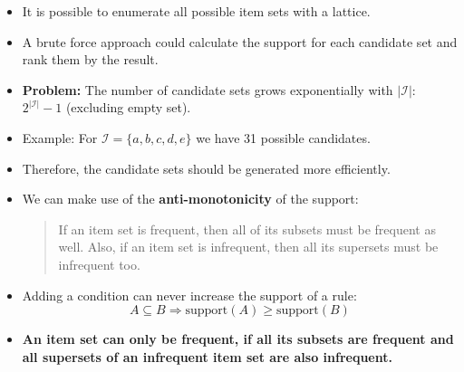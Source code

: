\begin{frame}
	\begin{itemize}
		\item It is possible to enumerate all possible item sets with a lattice.
		\item A brute force approach could calculate the support for each candidate set and rank them by the result.
		\item \textbf{Problem:} The number of candidate sets grows exponentially with $\vert \mathcal{I} \vert$: $2^{\vert \mathcal{I} \vert} - 1$ (excluding empty set).
		\item Example: For $\mathcal{I} = \{ a, b, c, d, e \}$ we have 31 possible candidates.
		\item Therefore, the candidate sets should be generated more efficiently.
		\item We can make use of the \textbf{anti-monotonicity} of the support:
		\begin{quote}
			If an item set is frequent, then all of its subsets must be frequent as well. Also, if an item set is infrequent, then all its supersets must be infrequent too.
		\end{quote}
		\item Adding a condition can never increase the support of a rule:
		\begin{equation}
			A \subseteq B \Longrightarrow \text{support}(A) \ge \text{support}(B)
		\end{equation}
		\item \textbf{An item set can only be frequent, if all its subsets are frequent and all supersets of an infrequent item set are also infrequent.}
	\end{itemize}
\end{frame}


